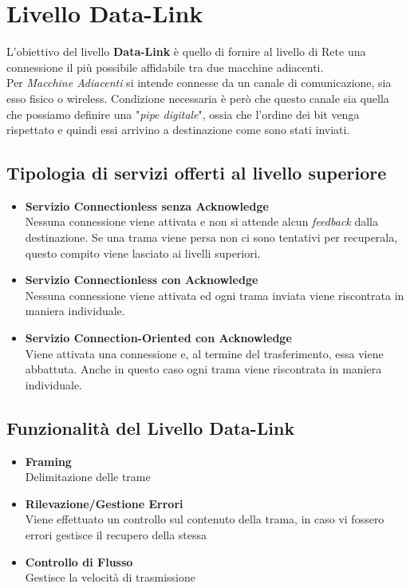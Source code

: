 \documentclass{article}
\begin{document}
\newpage                        
    \section{Livello Data-Link}
        L'obiettivo del livello \textbf{Data-Link} è quello di fornire al livello di Rete una connessione il più possibile affidabile tra due macchine adiacenti.\\
        Per \textit{Macchine Adiacenti} si intende connesse da un canale di comunicazione, sia esso fisico o wireless. Condizione necessaria è però che questo canale sia quella che possiamo definire una "\textit{pipe digitale}", ossia che l'ordine dei bit venga rispettato e quindi essi arrivino a destinazione come sono stati inviati.

        \subsection{Tipologia di servizi offerti al livello superiore}
            \begin{itemize}
                \item \textbf{Servizio Connectionless senza Acknowledge} \\
                      Nessuna connessione viene attivata e non si attende alcun \textit{feedback} dalla destinazione. Se una trama viene persa non ci sono tentativi per recuperala, questo compito viene lasciato ai livelli superiori.
                \item \textbf{Servizio Connectionless con Acknowledge} \\
                      Nessuna connessione viene attivata ed ogni trama inviata viene riscontrata in maniera individuale.
                \item \textbf{Servizio Connection-Oriented con Acknowledge} \\
                      Viene attivata una connessione e, al termine del trasferimento, essa viene abbattuta. Anche in questo caso ogni trama viene riscontrata in maniera individuale.
            \end{itemize}

        \subsection{Funzionalità del Livello Data-Link}
            \begin{itemize}
                \item \textbf{Framing} \\
                      Delimitazione delle trame
                \item \textbf{Rilevazione/Gestione Errori} \\
                      Viene effettuato un controllo sul contenuto della trama, in caso vi fossero errori gestisce il recupero della stessa
                \item \textbf{Controllo di Flusso} \\
                      Gestisce la velocità di trasmissione
            \end{itemize}
\end{document}
